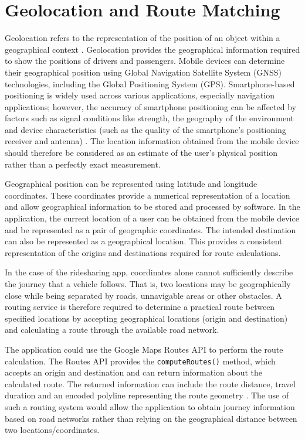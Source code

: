 \section{Geolocation and Route Matching}
\label{sec:geo}

Geolocation refers to the representation of the position of an object within a geographical context \citep{gustafsson2014}. Geolocation provides the geographical information required to show the positions of drivers and passengers. Mobile devices can determine their geographical position using Global Navigation Satellite System (GNSS) technologies, including the Global Positioning System (GPS). Smartphone-based positioning is widely used across various applications, especially navigation applications; however, the accuracy of smartphone positioning can be affected by factors such as signal conditions like strength, the geography of the environment and device characteristics (such as the quality of the smartphone's positioning receiver and antenna) \citep{zangenehnejad2021}. The location information obtained from the mobile device should therefore be considered as an estimate of the user's physical position rather than a perfectly exact measurement.

Geographical position can be represented using latitude and longitude coordinates. These coordinates provide a numerical representation of a location and allow geographical information to be stored and processed by software. In the application, the current location of a user can be obtained from the mobile device and be represented as a pair of geographic coordinates. The intended destination can also be represented as a geographical location. This provides a consistent representation of the origins and destinations required for route calculations.

In the case of the ridesharing app, coordinates alone cannot sufficiently describe the journey that a vehicle follows. That is, two locations may be geographically close while being separated by roads, unnavigable areas or other obstacles. A routing service is therefore required to determine a practical route between specified locations by accepting geographical locations (origin and destination) and calculating a route through the available road network.

The application could use the Google Maps Routes API to perform the route calculation. The Routes API provides the \texttt{computeRoutes()} method, which accepts an origin and destination and can return information about the calculated route. The returned information can include the route distance, travel duration and an encoded polyline representing the route geometry \citep{google2026a}. The use of such a routing system would allow the application to obtain journey information based on road networks rather than relying on the geographical distance between two locations/coordinates.

